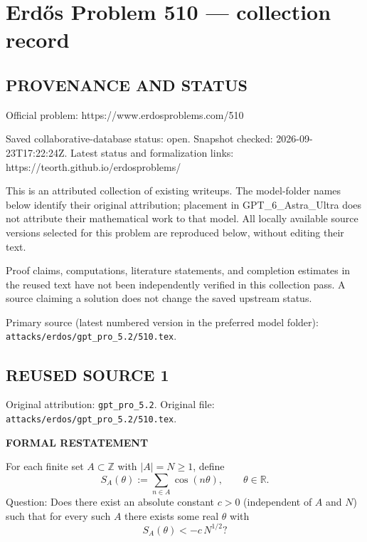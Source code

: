 \section*{Erd\H{o}s Problem 510 --- collection record}

\subsection*{PROVENANCE AND STATUS}
Official problem: https://www.erdosproblems.com/510

Saved collaborative-database status: open.
Snapshot checked: 2026-09-23T17:22:24Z.
Latest status and formalization links: https://teorth.github.io/erdosproblems/

This is an attributed collection of existing writeups. The model-folder names below identify their original attribution; placement in GPT\_6\_Astra\_Ultra does not attribute their mathematical work to that model. All locally available source versions selected for this problem are reproduced below, without editing their text.

Proof claims, computations, literature statements, and completion estimates in the reused text have not been independently verified in this collection pass. A source claiming a solution does not change the saved upstream status.

Primary source (latest numbered version in the preferred model folder): \texttt{attacks/erdos/gpt\_pro\_5.2/510.tex}.

\subsection*{REUSED SOURCE 1}
Original attribution: \texttt{gpt\_pro\_5.2}.
Original file: \texttt{attacks/erdos/gpt\_pro\_5.2/510.tex}.

\noindent\textbf{FORMAL RESTATEMENT}

For each finite set $A\subset\mathbb{Z}$ with $|A|=N\ge 1$, define
\[
S_A(\theta):=\sum_{n\in A}\cos(n\theta),\qquad \theta\in\mathbb{R}.
\]
Question: Does there exist an absolute constant $c>0$ (independent of $A$ and $N$) such that for every such $A$ there exists some real $\theta$ with
\[
S_A(\theta) < -c\,N^{1/2}?
\]

